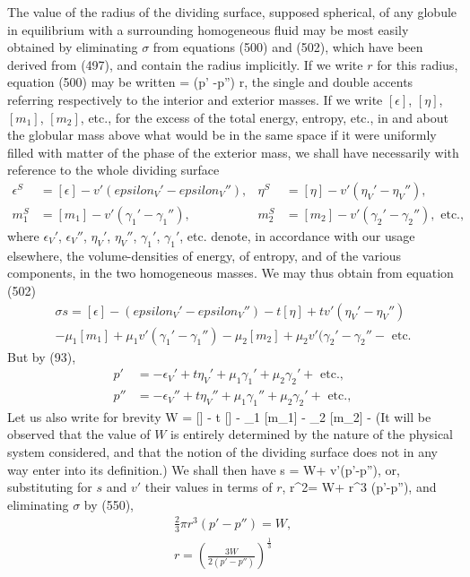 \documentclass[12pt]{memoir}
\begin{document}
{The value of the radius of the dividing surface, supposed spherical, of any globule in equilibrium with a surrounding homogeneous fluid may be most easily obtained by eliminating $\sigma$ from equations (500) and (502), which have been derived from (497), and contain the radius implicitly. If we write $r$ for this radius, equation (500) may be written
\sigma = (p' -p'') r,   \label{550}\eqe
the single and double accents referring respectively to the interior and exterior masses. If we write $[\epsilon]$, $[\eta]$, $[m_1]$, $[m_2]$, etc., for the excess of the total energy, entropy, etc., in and about the globular mass above what would be in the same space if it were uniformly filled with matter of the phase of the exterior mass, we shall have necessarily with reference to the whole dividing surface
\begin{align*}
\epsilon^S&= [\epsilon] - v'(epsilon_V' - epsilon_V''), & \eta^S &= [\eta] - v'(\eta_V' - \eta_V''), \\
m_1^S &= [m_1] - v'(\gamma_1' - \gamma_1''), & m_2^S &= [m_2]- v'(\gamma_2' - \gamma_2''), \text{ etc.},\end{align*}
where $\epsilon_V'$, $\epsilon_V''$, $\eta_V'$, $\eta_V''$, $\gamma_1'$, $\gamma_1'$, etc. denote, in accordance with our usage elsewhere, the volume-densities of energy, of entropy, and of the various components, in the two homogeneous masses. We may thus obtain from equation (502)
\begin{multline}\sigma s = [\epsilon] -(epsilon_V' - epsilon_V'')- t[\eta] + tv'(\eta_V' - \eta_V'') \\
- \mu_1 [m_1] + \mu_1v'(\gamma_1' - \gamma_1'')- \mu_2[m_2] + \mu_2v'(\gamma_2' - \gamma_2''- \text{ etc.} \label{551} \end{multline}
But by (93),
\begin{align*}
p' &= - \epsilon_V' + t\eta_V' + \mu_1\gamma_1'+ \mu_2\gamma_2' + \text{ etc.}, \\
p'' &= - \epsilon_V'' + t\eta_V'' + \mu_1\gamma_1''+ \mu_2\gamma_2' + \text{ etc.},\end{align*}
Let us also write for brevity
\eqs W = [\epsilon] - t [\eta] - \mu_1 [m_1] - \mu_2 [m_2] -  \label{552}\eqe
(It will be observed that the value of $W$ is entirely determined by the nature of the physical system considered, and that the notion of the dividing surface does not in any way enter into its definition.) We shall then have
\eqs \sigma s = W+ v'(p'-p''),  \label{553}\eqe
or, substituting for $s$ and $v'$ their values in terms of $r$,
\pi r^2\sigma = W+ \pi r^3 (p'-p''),  \label{554}\eqe
and eliminating $\sigma$ by (550),
\begin{gather}
\tfrac{2}{3}\pi r^3 (p'-p'')= W,    \label{555} \\
r= \left( \frac{3W}{2(p'-p'')}\right)^{\frac{1}{3}}   \label{556} \end{gather}

}
\end{document}
